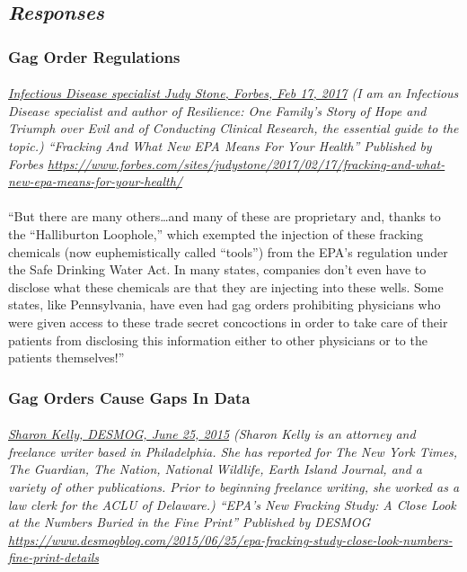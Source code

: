 \documentclass{article}
\begin{document}
\subsection{\emph{Responses}}

\subsubsection{Gag Order Regulations}
\paragraph{}
\small
\textit{
\underline{Infectious Disease specialist Judy Stone, Forbes, Feb 17, 2017}
(I am an Infectious Disease specialist and author of Resilience: One Family's Story of Hope and Triumph over Evil and of Conducting Clinical Research, the essential guide to the topic.) ``Fracking And What New EPA Means For Your Health'' Published by Forbes   
\url{https://www.forbes.com/sites/judystone/2017/02/17/fracking-and-what-new-epa-means-for-your-health/}}
\normalsize

\paragraph{}
``But there are many others…and many of these are proprietary and, thanks to the “Halliburton Loophole,” which exempted the injection of these fracking chemicals (now euphemistically called “tools”) from the EPA’s regulation under the Safe Drinking Water Act. In many states, companies don’t even have to disclose what these chemicals are that they are injecting into these wells. Some states, like Pennsylvania, have even had gag orders prohibiting physicians who were given access to these trade secret concoctions in order to take care of their patients from disclosing this information either to other physicians or to the patients themselves!”

\subsubsection{Gag Orders Cause Gaps In Data}
\paragraph{}
\small
\textit{
\underline{Sharon Kelly, DESMOG,  June 25, 2015}
(Sharon Kelly is an attorney and freelance writer based in Philadelphia. She has reported for The New York Times, The Guardian, The Nation, National Wildlife, Earth Island Journal, and a variety of other publications. Prior to beginning freelance writing, she worked as a law clerk for the ACLU of Delaware.) “EPA's New Fracking Study: A Close Look at the Numbers Buried in the Fine Print” Published by DESMOG  
\url{https://www.desmogblog.com/2015/06/25/epa-fracking-study-close-look-numbers-fine-print-details}}
\normalsize
\end{document}
